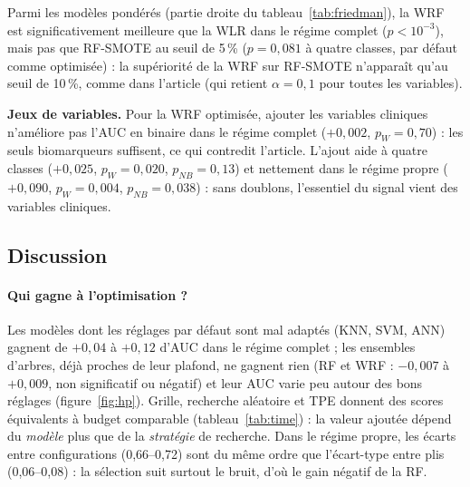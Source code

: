 \begin{table}[t]\centering\caption{Tests de Friedman et post-hoc de Conover (valeurs $p$ corrigées de Holm) sur les 10 plis externes : à gauche les six classifieurs de base (RF contre chaque autre modèle), à droite les modèles pondérés (WRF contre WLR et RF-SMOTE).}\label{tab:friedman}
\scriptsize\setlength{\tabcolsep}{2.4pt}
\end{table}

Parmi les modèles pondérés (partie droite du tableau~\ref{tab:friedman}), la WRF est significativement meilleure que la WLR dans le régime complet ($p<10^{-3}$), mais pas que RF-SMOTE au seuil de 5\,\% ($p=0{,}081$ à quatre classes, par défaut comme optimisée) : la supériorité de la WRF sur RF-SMOTE n'apparaît qu'au seuil de 10\,\%, comme dans l'article (qui retient $\alpha=0{,}1$ pour toutes les variables).

\textbf{Jeux de variables.} Pour la WRF optimisée, ajouter les variables cliniques n'améliore pas l'AUC en binaire dans le régime complet ($+0{,}002$, $p_W=0{,}70$) : les seuls biomarqueurs suffisent, ce qui contredit l'article. L'ajout aide à quatre classes ($+0{,}025$, $p_W=0{,}020$, $p_{NB}=0{,}13$) et nettement dans le régime propre ($+0{,}090$, $p_W=0{,}004$, $p_{NB}=0{,}038$) : sans doublons, l'essentiel du signal vient des variables cliniques.

\subsection{Discussion}
\paragraph{Qui gagne à l'optimisation ?} Les modèles dont les réglages par défaut sont mal adaptés (KNN, SVM, ANN) gagnent de $+0{,}04$ à $+0{,}12$ d'AUC dans le régime complet ; les ensembles d'arbres, déjà proches de leur plafond, ne gagnent rien (RF et WRF : $-0{,}007$ à $+0{,}009$, non significatif ou négatif) et leur AUC varie peu autour des bons réglages (figure~\ref{fig:hp}). Grille, recherche aléatoire et TPE donnent des scores équivalents à budget comparable (tableau~\ref{tab:time}) : la valeur ajoutée dépend du \emph{modèle} plus que de la \emph{stratégie} de recherche. Dans le régime propre, les écarts entre configurations (0,66--0,72) sont du même ordre que l'écart-type entre plis (0,06--0,08) : la sélection suit surtout le bruit, d'où le gain négatif de la RF.

